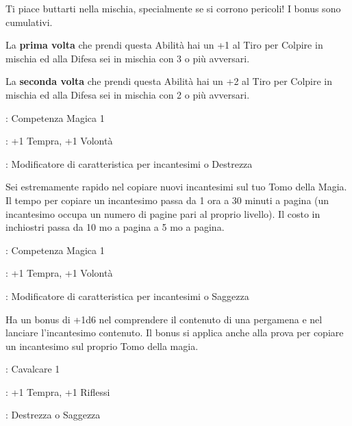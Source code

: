 \begin{multicols}{2}
Ti piace buttarti nella mischia, specialmente se si corrono pericoli! I bonus sono cumulativi.

La \textbf{prima volta} che prendi questa Abilità hai un +1 al Tiro per Colpire in mischia ed alla Difesa sei in mischia con 3 o più avversari.

La \textbf{seconda volta} che prendi questa Abilità hai un +2 al Tiro per Colpire in mischia ed alla Difesa sei in mischia con 2 o più avversari.

\begin{description}[noitemsep, topsep=0pt, parsep=0pt, partopsep=0pt, leftmargin=0cm, labelwidth=2.5cm]
    \item[\textbf{Requisito}]: Competenza Magica 1
    \item[\textbf{Tiri Salvezza}]: +1 Tempra, +1 Volontà
    \item[\textbf{Caratteristica}]: Modificatore di caratteristica per incantesimi o Destrezza
\end{description}

Sei estremamente rapido nel copiare nuovi incantesimi sul tuo Tomo della Magia. Il tempo per copiare un incantesimo passa da 1 ora a 30 minuti a pagina (un incantesimo occupa un numero di pagine pari al proprio livello). Il costo in inchiostri passa da 10 mo a pagina a 5 mo a pagina.

\begin{description}[noitemsep, topsep=0pt, parsep=0pt, partopsep=0pt, leftmargin=0cm, labelwidth=2.5cm]
    \item[\textbf{Requisito}]: Competenza Magica 1
    \item[\textbf{Tiri Salvezza}]: +1 Tempra, +1 Volontà
    \item[\textbf{Caratteristica}]: Modificatore di caratteristica per incantesimi o Saggezza
\end{description}

Ha un bonus di +1d6 nel comprendere il contenuto di una pergamena e nel lanciare l'incantesimo contenuto. Il bonus si applica anche alla prova per copiare un incantesimo sul proprio Tomo della magia.

\begin{description}[noitemsep, topsep=0pt, parsep=0pt, partopsep=0pt, leftmargin=0cm, labelwidth=2.5cm]
    \item[\textbf{Requisito}]: Cavalcare 1
    \item[\textbf{Tiri Salvezza}]: +1 Tempra, +1 Riflessi
    \item[\textbf{Caratteristica}]: Destrezza o Saggezza
\end{description}


\end{multicols}
